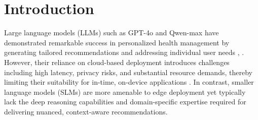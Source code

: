 \documentclass[preprint,12pt]{elsarticle}
\begin{document}


\section{Introduction}
\label{sec1}

Large language models (LLMs) such as GPT-4o and Qwen-max have demonstrated remarkable success in personalized health management by generating tailored recommendations and addressing individual user needs \cite{caruccio2024can}, \cite{cao2024spider2}. However, their reliance on cloud-based deployment introduces challenges including high latency, privacy risks, and substantial resource demands, thereby limiting their suitability for in-time, on-device applications \cite{friha2024llm}. In contrast, smaller language models (SLMs) are more amenable to edge deployment yet typically lack the deep reasoning capabilities and domain-specific expertise required for delivering nuanced, context-aware recommendations.
\end{document}
